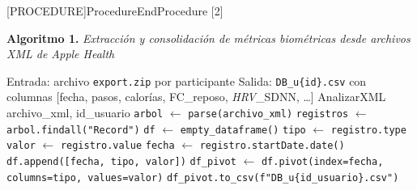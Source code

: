 \algrenewcommand{}
\algrenewcommand{}
\algrenewcommand{}
\algrenewcommand{}
\algrenewcommand{}
\algrenewcommand{}
\algrenewcommand{}
\algrenewcommand\algorithmicelsif{\algorithmicelse\ \algorithmicif}
\algrenewcommand\algorithmicendif{\algorithmicend\ \algorithmicif}
\algrenewcommand\algorithmicendfor{\algorithmicend\ \algorithmicfor}
\algrenewcommand\algorithmicendprocedure{\algorithmicend\ \algorithmicprocedure}

\makeatletter
{}[PROCEDURE]{Procedure}{EndProcedure}%
   [2]{\algorithmicprocedure\ }%
   {\algorithmicend\ \algorithmicprocedure}%
\makeatother

\begin{minipage}{\textwidth}
    \label{alg:xml_csv}
    \toprule
    \textbf{Algoritmo 1.} \textit{Extracción y consolidación de métricas biométricas desde archivos XML de Apple Health}
    \par\noindent\rule{0pt}{0.5em}
    \midrule
\end{minipage}

\ttfamily\small
\begin{algorithmic}[1]
    \State Entrada: archivo \texttt{export.zip} por participante
    \State Salida: \texttt{DB\_u\{id\}.csv} con columnas [fecha, pasos, calorías, FC\_reposo, \textit{HRV}\_SDNN, \ldots]
    \State
    \Procedure AnalizarXML {archivo\_xml, id\_usuario}
        \State \texttt{arbol} $\gets$ \texttt{parse(archivo\_xml)}
        \State \texttt{registros} $\gets$ \texttt{arbol.findall("Record")}
        \State \texttt{df} $\gets$ \texttt{empty\_dataframe()}
                \State \texttt{tipo} $\gets$ \texttt{registro.type}
                \State \texttt{valor} $\gets$ \texttt{registro.value}
                \State \texttt{fecha} $\gets$ \texttt{registro.startDate.date()}
                \State \texttt{df.append([fecha, tipo, valor])}
            \EndIf
        \EndFor
        \State \texttt{df\_pivot} $\gets$ \texttt{df.pivot(index=fecha, columns=tipo, values=valor)}
        \State \texttt{df\_pivot.to\_csv(f"DB\_u\{id\_usuario\}.csv")}
    \EndProcedure
\end{algorithmic}
\normalfont

